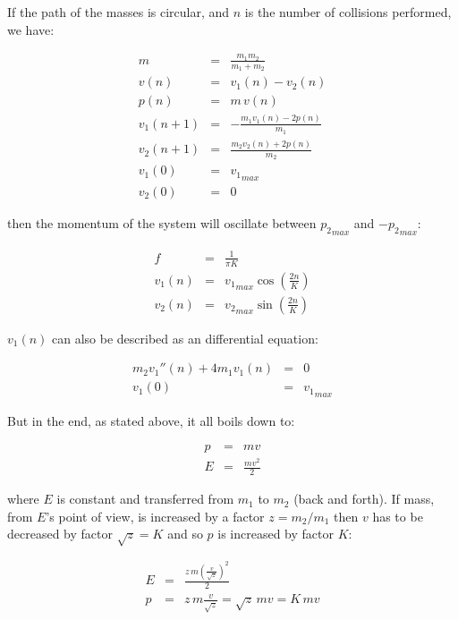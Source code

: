 If the path of the masses is circular, and $n$ is the number of collisions performed, we have:

\begin{eqnarray}
m &=& \frac{m_1 m_2}{m_1 + m_2} \\
v(n) &=& v_1(n) - v_2(n) \\
p(n) &=& m \, v(n) \\
v_1(n+1) &=& -\frac{m_1 v_1(n) - 2p(n)}{m_1} \\
v_2(n+1) &=& \frac{m_2 v_2(n) + 2p(n)}{m_2} \\
v_1(0) &=& {v_1}_{max} \\
v_2(0) &=& 0
\end{eqnarray}

then the momentum of the system will oscillate between ${p_2}_{max}$ and $-{p_2}_{max}$:

\begin{eqnarray}
f &=& \frac{1}{\pi K} \\
v_1(n) &=& {v_1}_{max} \cos (\frac{2n}{K}) \\
v_2(n) &=& {v_2}_{max} \sin (\frac{2n}{K})
\end{eqnarray}

$v_1(n)$ can also be described as an differential equation:

\begin{eqnarray}
m_2 v_1''(n) + 4 m_1 v_1(n) &=& 0 \\
v_1(0) &=& {v_1}_{max}
\end{eqnarray}

But in the end, as stated above, it all boils down to:

\begin{eqnarray}
p &=& m v\\
E &=& \frac{m v^2}{2}
\end{eqnarray}

where $E$ is constant and transferred from $m_1$ to $m_2$ (back and forth).
If mass, from $E$'s point of view, is increased by a factor $z=m_2/m_1$ then $v$ has to be decreased by factor $\sqrt{z}=K$ and so $p$ is increased by factor $K$:

\begin{eqnarray}
E &=& \frac{z\,m \left( \frac{v}{\sqrt{z}} \right)^2}{2} \\
p &=& z\,m \frac{v}{\sqrt{z}} = \sqrt{z}\,m v = K\,m v \\
\end{eqnarray}

